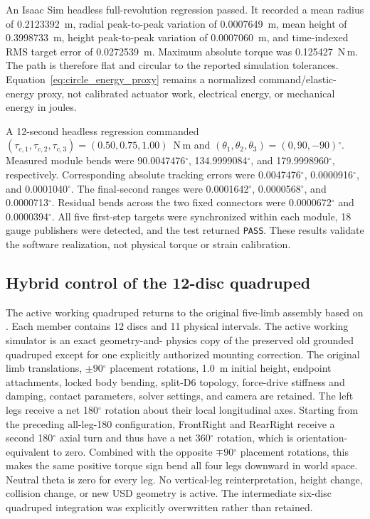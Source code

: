 \documentclass[11pt,letterpaper]{article}
\newcommand{\degrees}{\ensuremath{^{\circ}}}
\begin{document}
An Isaac Sim headless full-revolution regression passed. It recorded a mean
radius of 0.2123392~m, radial peak-to-peak variation of 0.0007649~m, mean
height of 0.3998733~m, height peak-to-peak variation of 0.0007060~m, and
time-indexed RMS target error of 0.0272539~m. Maximum absolute torque was
0.125427~N\,m. The path is therefore flat and circular to the reported
simulation tolerances. Equation~\eqref{eq:circle_energy_proxy} remains a
normalized command/elastic-energy proxy, not calibrated actuator work,
electrical energy, or mechanical energy in joules.

A 12-second headless regression commanded
$(\tau_{c,1},\tau_{c,2},\tau_{c,3})=(0.50,0.75,1.00)$~N\,m and
$(\theta_1,\theta_2,\theta_3)=(0,90,-90)\degrees{}$. Measured module bends
were 90.0047476\degrees{}, 134.9999084\degrees{}, and
179.9998960\degrees{}, respectively. Corresponding absolute tracking errors
were 0.0047476\degrees{}, 0.0000916\degrees{}, and 0.0001040\degrees{}.
The final-second ranges were 0.0001642\degrees{}, 0.0000568\degrees{}, and
0.0000713\degrees{}. Residual bends across the two fixed connectors were
0.0000672\degrees{} and 0.0000394\degrees{}. All five first-step targets were
synchronized within each module, 18 gauge publishers were detected, and the
test returned \texttt{PASS}. These results validate the software realization,
not physical torque or strain calibration.

\subsection{Hybrid control of the 12-disc quadruped}
The active working quadruped returns to the original five-limb assembly based
on . Each member contains 12 discs and 11
physical intervals. The active working simulator is an exact geometry-and-
physics copy of the preserved old grounded quadruped except for one explicitly
authorized mounting correction. The original limb translations,
$\pm90\degrees{}$ placement rotations, 1.0~m initial height, endpoint
attachments, locked body bending, split-D6 topology, force-drive stiffness and
damping, contact parameters, solver settings, and camera are retained.
The left legs receive a net 180\degrees{} rotation about their local
longitudinal axes. Starting from the preceding all-leg-180 configuration,
FrontRight and RearRight receive a second 180\degrees{} axial turn and thus
have a net 360\degrees{} rotation, which is orientation-equivalent to zero.
Combined with the opposite $\mp90\degrees{}$ placement rotations, this makes
the same positive torque sign bend all four legs downward in world space.
Neutral theta is zero for every leg. No
vertical-leg reinterpretation, height change, collision change, or new USD
geometry is active. The intermediate six-disc quadruped integration was
explicitly overwritten rather than retained.
\end{document}
